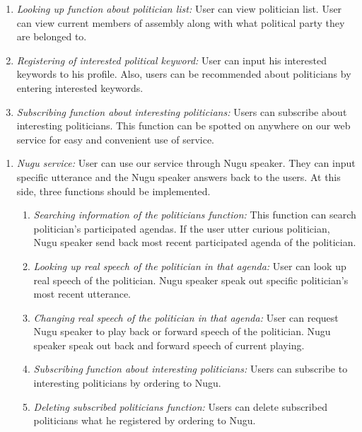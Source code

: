\documentclass[conference]{IEEEtran}
\begin{document}
\begin{enumerate}
\begin{enumerate}
        \item \textit {Looking up function about politician list:} User can view politician list. User can view current members of assembly along with what political party they are belonged to.\\
        
        \item \textit {Registering of interested political keyword:} User can input his interested keywords to his profile. Also, users can be recommended about politicians by entering interested keywords. \\
        
        \item \textit {Subscribing function about interesting politicians:} Users can subscribe about interesting politicians. This function can be spotted on anywhere on our web service for easy and convenient use of service.\\
        \end{enumerate}
    \end{enumerate}

    \begin{enumerate}
        \item \textit{Nugu service:} User can use our service through Nugu speaker. They can input specific utterance and the Nugu speaker answers back to the users. At this side, three functions should be implemented.\\
        
        \begin{enumerate}
        \item \textit{Searching information of the politicians function:} This function can search politician’s participated agendas. If the user utter curious politician, Nugu speaker send back most recent participated agenda of the politician.\\
        
        \item \textit{Looking up real speech of the politician in that agenda:} User can look up real speech of the politician. Nugu speaker speak out specific politician’s most recent utterance.\\
        
        \item \textit{Changing real speech of the politician in that agenda:} User can request Nugu speaker to play back or forward speech of the politician. Nugu speaker speak out back and forward speech of current playing.\\
        
        \item \textit {Subscribing function about interesting politicians:} Users can subscribe to interesting politicians by ordering to Nugu.\\
        
        \item \textit {Deleting subscribed politicians function:} Users can delete subscribed politicians what he registered by ordering to Nugu. \\
           \end{enumerate}
    \end{enumerate}
\end{document}
